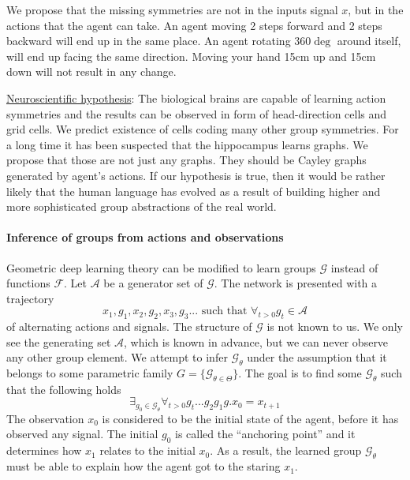 \documentclass[12pt]{article}
\begin{document}
We propose that the missing symmetries are not in the inputs signal $x$, but in the actions that the agent can take. An agent moving 2 steps forward and 2 steps backward will end up in the same place. An agent rotating $360\deg$ around itself, will end up facing the same direction. Moving your hand 15cm up and 15cm down will not result in any change. 

\underline{Neuroscientific hypothesis}: The biological brains are capable of learning action symmetries and the results can be observed in form of head-direction cells and grid cells. We predict existence of cells coding many other group symmetries. For a long time it has been suspected that the hippocampus learns graphs. We propose that those are not just any graphs. They should be Cayley graphs generated by agent's actions. If our hypothesis is true, then it would be rather likely that the human language has evolved as a result of building higher and more sophisticated group abstractions of the real world. 

\paragraph{Inference of groups from actions and observations}

Geometric deep learning theory can be modified to learn groups $\mathcal{G}$ instead of functions $\mathcal{F}$. Let $\mathcal{A}$ be a generator set of $\mathcal{G}$. The network is presented with a trajectory 
\[x_1,g_1,x_2,g_2,x_3,g_3... \text{ such that } \forall_{t>0} g_t \in \mathcal{A}\] 
of alternating actions and signals. The structure of $\mathcal{G}$ is not known to us. We only see the generating set $\mathcal{A}$, which is known in advance, but we can never observe any other group element. We attempt to infer  $\mathcal{G}_\theta$ under the assumption that  it belongs to some parametric family $G=\{\mathcal{G}_{\theta\in\Theta}\}$. The goal is to find some $\mathcal{G}_\theta$ such that the following holds 
\[
\exists_{ g_0\in\mathcal{G}_\theta} \forall_{t>0} g_t...g_2g_1g.x_0 = x_{t+1}
\] The observation $x_0$ is considered to be the initial state of the agent, before it has observed any signal. The initial $g_0$ is called the ``anchoring point'' and it determines how $x_1$ relates to the initial $x_0$. As a result, the learned group $\mathcal{G}_\theta$ must be able to explain how the agent got to the staring $x_1$. 
\end{document}
